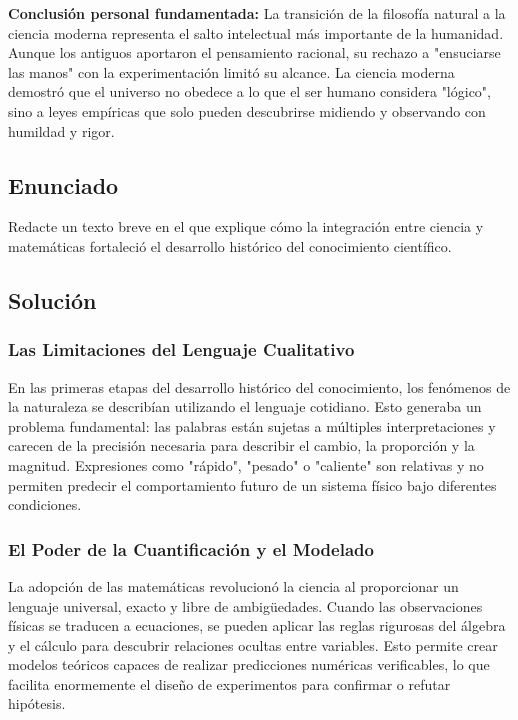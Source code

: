 \documentclass[12pt, a4paper]{article}
\begin{document}
\vspace{0.5cm}
\textbf{Conclusión personal fundamentada:} La transición de la filosofía natural a la ciencia moderna representa el salto intelectual más importante de la humanidad. Aunque los antiguos aportaron el pensamiento racional, su rechazo a "ensuciarse las manos" con la experimentación limitó su alcance. La ciencia moderna demostró que el universo no obedece a lo que el ser humano considera "lógico", sino a leyes empíricas que solo pueden descubrirse midiendo y observando con humildad y rigor.

\newpage

\subsection*{Enunciado}
Redacte un texto breve en el que explique cómo la integración entre ciencia y matemáticas fortaleció el desarrollo histórico del conocimiento científico.

\subsection*{Solución}

\subsubsection*{Las Limitaciones del Lenguaje Cualitativo}
En las primeras etapas del desarrollo histórico del conocimiento, los fenómenos de la naturaleza se describían utilizando el lenguaje cotidiano. Esto generaba un problema fundamental: las palabras están sujetas a múltiples interpretaciones y carecen de la precisión necesaria para describir el cambio, la proporción y la magnitud. Expresiones como "rápido", "pesado" o "caliente" son relativas y no permiten predecir el comportamiento futuro de un sistema físico bajo diferentes condiciones.

\subsubsection*{El Poder de la Cuantificación y el Modelado}
La adopción de las matemáticas revolucionó la ciencia al proporcionar un lenguaje universal, exacto y libre de ambigüedades. Cuando las observaciones físicas se traducen a ecuaciones, se pueden aplicar las reglas rigurosas del álgebra y el cálculo para descubrir relaciones ocultas entre variables. Esto permite crear modelos teóricos capaces de realizar predicciones numéricas verificables, lo que facilita enormemente el diseño de experimentos para confirmar o refutar hipótesis.
\end{document}
